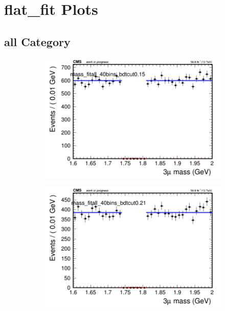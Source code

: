 \section{flat\_fit Plots}

\subsection{all Category}
\label{sec:flatfitall}

\begin{figure}[H]
    \centering
    \begin{subfigure}{0.2\textwidth}
        \includegraphics[width=\textwidth]{flat_fit/plots/all/massfit_all_40bins_bdtcut0.15.png}
        \caption{}
    \end{subfigure}
    \begin{subfigure}{0.2\textwidth}
        \includegraphics[width=\textwidth]{flat_fit/plots/all/massfit_all_40bins_bdtcut0.21.png}

\end{subfigure}
\end{figure}
